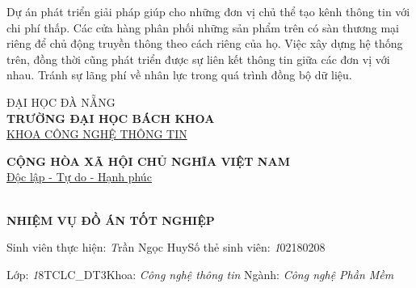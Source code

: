 \documentclass[11pt]{report}
\newcommand{\me}{Trần Ngọc Huy}
\newcommand{\msv}{102180208}
\newcommand{\myclass}{18TCLC\_DT3}
\begin{document}
	Dự án phát triển giải pháp giúp cho những đơn vị chủ thể tạo kênh thông tin với chi phí thấp. Các cửa hàng phân phối những sản phẩm trên có sàn thương mại riêng để chủ động truyền thông theo cách riêng của họ. Việc xây dựng hệ thống trên, đồng thời cũng phát triển được sự liên kết thông tin giữa các đơn vị với nhau. Tránh sự lãng phí về nhân lực trong quá trình đồng bộ dữ liệu.
	
	
	\pagebreak
	
	
	\begin{minipage}[t]{.5\textwidth}
		\centering
		ĐẠI HỌC ĐÀ NẴNG\\
		\textbf{TRƯỜNG ĐẠI HỌC BÁCH KHOA}\\
		\underline{KHOA CÔNG NGHỆ THÔNG TIN}
	\end{minipage}\hfill 
	\begin{minipage}[t]{.5\textwidth}
		\centering
		\textbf{CỘNG HÒA XÃ HỘI CHỦ NGHĨA VIỆT NAM}\\
		\underline{Độc lập - Tự do - Hạnh phúc}
	\end{minipage}\\[2em]
	
	\center\Large\textbf{NHIỆM VỤ ĐỒ ÁN TỐT NGHIỆP}
	\vspace{14px}
	\fontsize{12px}{12px}\selectfont
	
	Sinh viên thực hiện: \emph\me \dotfill Số thẻ sinh viên: \emph\msv \dotfill 
	
	Lớp: \emph\myclass \dotfill Khoa: \emph{Công nghệ thông tin} \dotfill Ngành: \emph{Công nghệ Phần Mềm} \dotfill
	
\end{document}
